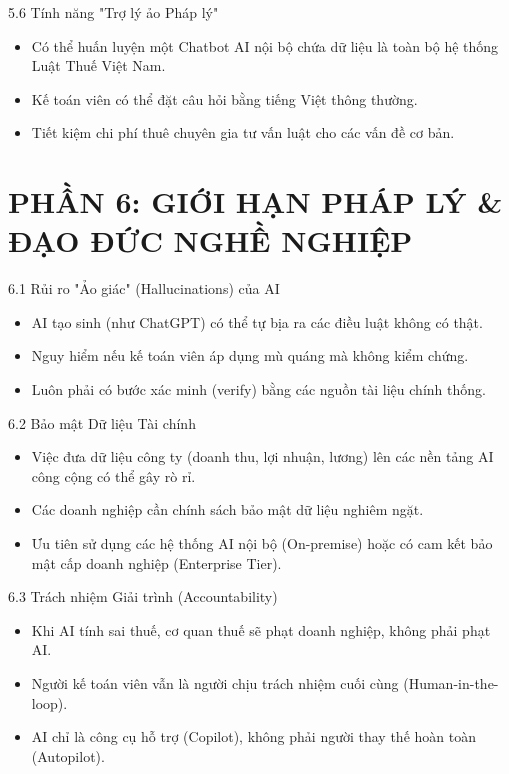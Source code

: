 \documentclass[aspectratio=169]{beamer}
\begin{document}
\begin{frame}{5.6 Tính năng "Trợ lý ảo Pháp lý"}
    \begin{itemize}
        \item Có thể huấn luyện một Chatbot AI nội bộ chứa dữ liệu là toàn bộ hệ thống Luật Thuế Việt Nam.
        \item Kế toán viên có thể đặt câu hỏi bằng tiếng Việt thông thường.
        \item Tiết kiệm chi phí thuê chuyên gia tư vấn luật cho các vấn đề cơ bản.
    \end{itemize}
\end{frame}


\section{PHẦN 6: GIỚI HẠN PHÁP LÝ \& ĐẠO ĐỨC NGHỀ NGHIỆP}


\begin{frame}{6.1 Rủi ro "Ảo giác" (Hallucinations) của AI}
    \begin{itemize}
        \item AI tạo sinh (như ChatGPT) có thể tự bịa ra các điều luật không có thật.
        \item Nguy hiểm nếu kế toán viên áp dụng mù quáng mà không kiểm chứng.
        \item Luôn phải có bước xác minh (verify) bằng các nguồn tài liệu chính thống.
    \end{itemize}
\end{frame}


\begin{frame}{6.2 Bảo mật Dữ liệu Tài chính}
    \begin{itemize}
        \item Việc đưa dữ liệu công ty (doanh thu, lợi nhuận, lương) lên các nền tảng AI công cộng có thể gây rò rỉ.
        \item Các doanh nghiệp cần chính sách bảo mật dữ liệu nghiêm ngặt.
        \item Ưu tiên sử dụng các hệ thống AI nội bộ (On-premise) hoặc có cam kết bảo mật cấp doanh nghiệp (Enterprise Tier).
    \end{itemize}
\end{frame}


\begin{frame}{6.3 Trách nhiệm Giải trình (Accountability)}
    \begin{itemize}
        \item Khi AI tính sai thuế, cơ quan thuế sẽ phạt doanh nghiệp, không phải phạt AI.
        \item Người kế toán viên vẫn là người chịu trách nhiệm cuối cùng (Human-in-the-loop).
        \item AI chỉ là công cụ hỗ trợ (Copilot), không phải người thay thế hoàn toàn (Autopilot).
    \end{itemize}
\end{frame}
\end{document}
